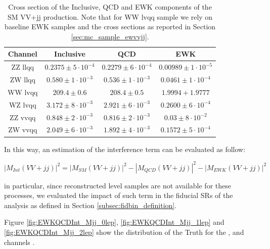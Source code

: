 \begin{table}[h]
    \centering
    \begin{tabular}{c|c|c|c} 
    \hline 
        Channel              & Inclusive   &  QCD      &    EWK \\    
    \hline 
        ZZ llqq              & $0.2375 \pm 5 \cdot 10^{-4}$  &  $0.2279 \pm 6 \cdot 10^{-4}$    &    $0.00989 \pm 1 \cdot 10^{-5}$\\    
        ZW llqq              & $0.580  \pm 1 \cdot 10^{-3}$  &  $0.536  \pm 1 \cdot 10^{-3}$    &    $0.0461 \pm 1 \cdot 10^{-4}$\\    
        
        WW lvqq              & $209.4 \pm 0.6$    &  $208.4 \pm 0.5$       &    $1.9994 + 1.9777$\\    
        WZ lvqq              & $3.172 \pm 8 \cdot 10^{-3}$  &  $2.921 \pm 6 \cdot 10^{-3}$     &    $0.2600 \pm 6 \cdot 10^{-4}$\\    

        ZZ vvqq              & $0.848 \pm 2 \cdot 10^{-3}$  &  $0.816 \pm 2 \cdot 10^{-3}$     &    $0.03 \pm 8 \cdot 10^{-2}$\\    
        ZW vvqq              & $2.049 \pm 6 \cdot 10^{-3}$  &  $1.892 \pm 4 \cdot 10^{-3}$     &    $0.1572 \pm 5 \cdot 10^{-4}$\\    

    \hline
    \end{tabular}
    \caption{Cross section of the Inclusive, QCD and EWK components of the SM VV+jj production. Note that for WW lvqq sample we rely on baseline EWK samples and the cross sections as reported in Section \ref{sec:mc_sample_ewvvjj}.}
    \label{tab:EWKQCDInt_xSec}
  \end{table}


In this way, an estimation of the interference term can be evaluated as follow:

\begin{equation}
    |M_{Int}(VV+jj)|^2 = | M_{SM}(VV+jj) |^2 - |M_{QCD}(VV+jj)|^2 - |M_{EWK}(VV+jj)|^2
\end{equation}

in particular, since reconstructed level samples are not available for these processes,
we evaluated the impact of such term in the fiducial SRs of the analysis as defined 
in Section \ref{subsec:fidbin_definition}.

Figure \ref{fig:EWKQCDInt_Mjj_0lep}, \ref{fig:EWKQCDInt_Mjj_1lep} and \ref{fig:EWKQCDInt_Mjj_2lep}
show the distribution of the Truth \mjjtag for the \zlep, \olep and \tlep channels 
.

